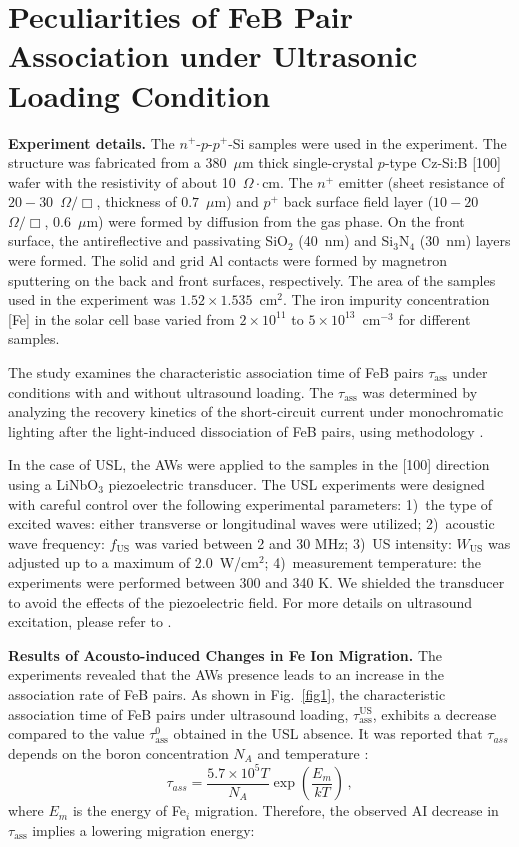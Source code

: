 \documentclass{ttp}
\begin{document}
\section{Peculiarities of FeB Pair Association under Ultrasonic Loading Condition}

\noindent \textbf{Experiment details.}
The $n^+$-$p$-$p^+$-Si samples were used in the experiment.
The structure was fabricated from a 380~$\mu$m thick single-crystal
$p$-type Cz-Si:B [100] wafer
with the resistivity of about 10~$\Omega\cdot$cm.
The $n^+$ emitter (sheet resistance of $20-30$~$\Omega/\Box$,
thickness of $0.7$~$\mu$m) and $p^+$ back surface field layer ($10-20$~$\Omega/\Box$, $0.6$~$\mu$m) were formed by diffusion from the gas phase.
On the front surface, the antireflective and passivating SiO$_2$ (40~nm) and Si$_3$N$_4$ (30~nm) layers
were formed.
The solid and grid Al contacts were formed by magnetron sputtering on the back and front surfaces, respectively.
The area of the samples used in the experiment was $1.52\times1.535$~cm$^2$.
The iron impurity concentration [Fe] in the solar cell base varied from $2\times10^{11}$ to $5\times10^{13}$~cm$^{-3}$ for different samples.

The study examines the characteristic association time of FeB pairs $\tau_\mathrm{ass}$ under conditions with and without ultrasound loading.
The $\tau_\mathrm{ass}$ was determined by analyzing the recovery kinetics of the  short-circuit current under monochromatic lighting
after  the light-induced dissociation of FeB pairs, using methodology \cite{Olikh2021JAP, Olikh2022:JMatSci}.

In the case of USL, the AWs were applied to the samples in the [100] direction using a LiNbO$_3$ piezoelectric transducer.
The USL experiments were designed with careful control over the following experimental parameters:
1)~the type of excited waves: either transverse or longitudinal waves were utilized;
2)~acoustic wave frequency: $f_\mathrm{US}$ was varied between 2 and 30 MHz;
3)~US intensity: $W_\mathrm{US}$ was adjusted up to a maximum of 2.0~W/cm$^2$;
4)~measurement temperature: the experiments were performed between 300 and 340 K.
We shielded the transducer to avoid the effects of the piezoelectric field.
For more details on ultrasound excitation, please refer to \cite{Olikh2021JAP, Olikh2022:JMatSci}.

\noindent \textbf{Results of Acousto-induced Changes in Fe Ion Migration.}
The experiments revealed that the AWs presence leads to an increase in the association rate of FeB pairs.
As shown in Fig.~\ref{fig1}, the characteristic association time of FeB pairs
under ultrasound loading, $\tau_\mathrm{ass}^\mathrm{US}$,
exhibits a decrease compared to the value $\tau_\mathrm{ass}^0$ obtained in the USL absence.
It was reported that $\tau_{ass}$ depends on the boron concentration $N_A$
and temperature \cite{FeBAssJAP2014}:
\begin{equation}
\label{eqTass}
\tau_{ass}=\frac{5.7\times10^5T}{N_A}\exp\left(\frac{E_m}{kT}\right)\,,
\end{equation}
where
$E_m$ is the energy of Fe$_i$ migration.
Therefore, the observed AI decrease in $\tau_\mathrm{ass}$ implies a lowering migration energy:
\end{document}
